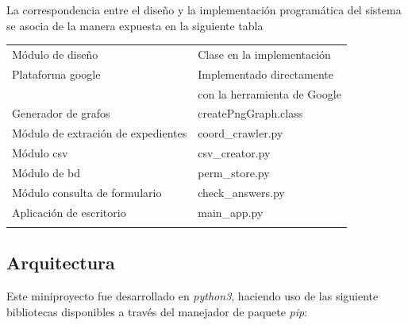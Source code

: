\documentclass[]{article}
\begin{document}
La correspondencia entre el diseño y la implementación programática del
sistema se asocia de la manera expuesta en la siguiente tabla

\newpage

\begin{longtable}[c]{@{}ll@{}}
\toprule\addlinespace
Módulo de diseño & Clase en la implementación
\\\addlinespace
\midrule\endhead
Plataforma google & Implementado directamente
\\\addlinespace
& con la herramienta de Google
\\\addlinespace
Generador de grafos & createPngGraph.class
\\\addlinespace
Módulo de extración de expedientes & coord\_crawler.py
\\\addlinespace
Módulo csv & csv\_creator.py
\\\addlinespace
Módulo de bd & perm\_store.py
\\\addlinespace
Módulo consulta de formulario & check\_answers.py
\\\addlinespace
Aplicación de escritorio & main\_app.py
\\\addlinespace
\bottomrule
\end{longtable}

\subsection{Arquitectura}\label{arquitectura}

Este miniproyecto fue desarrollado en \emph{python3}, haciendo uso de
las siguiente bibliotecas disponibles a través del manejador de paquete
\emph{pip}:
\end{document}

